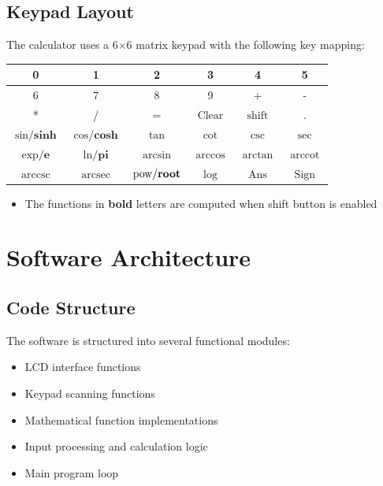 \documentclass[12pt]{article}
\begin{document}
\subsection{Keypad Layout}
The calculator uses a 6×6 matrix keypad with the following key mapping:
\begin{table}[H]
\centering
\begin{tabular}{|c|c|c|c|c|c|}
\hline
0 & 1 & 2 & 3 & 4 & 5 \\
\hline
6 & 7 & 8 & 9 & + & - \\
\hline
* & / & = & $\text{Clear}$ & $\text{shift}$ & . \\
\hline
$\sin\textbf{/sinh}$ & $\cos\textbf{/cosh}$ & $\tan$ & $\cot$ & $\csc$ & $\sec$ \\
\hline
$\exp\textbf{/e}$ & $\ln\textbf{/pi}$ & $\arcsin$ & $\arccos$ & $\arctan$ & $\operatorname{arccot}$ \\
\hline
$\operatorname{arccsc}$ & $\operatorname{arcsec}$ & $\text{pow/\textbf{root}}$ & $\log$ & $\text{Ans}$ & $\text{Sign}$ \\
\hline
\end{tabular}
\end{table}
\begin{itemize}
    \item The functions in \textbf{bold} letters are computed when shift button is enabled
\end{itemize}
\section{Software Architecture}
\subsection{Code Structure}
The software is structured into several functional modules:
\begin{itemize}
\item LCD interface functions
\item Keypad scanning functions
\item Mathematical function implementations
\item Input processing and calculation logic
\item Main program loop
\end{itemize}
\end{document}
